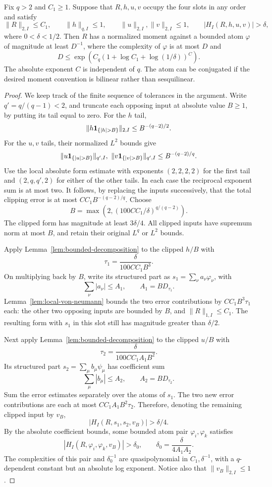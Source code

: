 \begin{lemma}\label{lem:detection}
Fix \(q>2\) and \(C_1\ge1\).
Suppose that \(R,h,u,v\) occupy the four slots in any order and satisfy
\[
 \|R\|_{2,I}\le C_1,\qquad
 \|h\|_{q,I}\le1,\qquad
 \|u\|_{2,I},\|v\|_{2,I}\le1,\qquad
 |H_I(R,h,u,v)|>\delta ,
\]
where \(0<\delta<1/2\).
Then \(R\) has a normalized moment against a bounded atom
\(\varphi\) of magnitude at least \(D^{-1}\), where the complexity of
\(\varphi\) is at most \(D\) and
\[
 D\le
 \exp\!\left(C_q(1+\log C_1+\log(1/\delta))^C\right).
\]
The absolute exponent \(C\) is independent of \(q\).
The atom can be conjugated if the desired moment convention is
bilinear rather than sesquilinear.
\end{lemma}

\begin{proof}
We keep track of the finite sequence of tolerances in the argument.
Write \(q'=q/(q-1)<2\), and truncate each opposing input at absolute
value \(B\ge1\), by putting its tail equal to zero.
For the \(h\) tail,
\[
 \|h\1_{\{|h|>B\}}\|_{2,I}\le B^{-(q-2)/2}.
\]
For the \(u,v\) tails, their normalized \(L^2\) bounds give
\[
 \|u\1_{\{|u|>B\}}\|_{q',I},
 \ \|v\1_{\{|v|>B\}}\|_{q',I}
       \le B^{-(q-2)/q}.
\]
Use the local absolute form estimate with exponents
\((2,2,2,2)\) for the first tail and
\((2,q,q',2)\) for either of the other tails.
In each case the reciprocal exponent sum is at most two.
It follows, by replacing the inputs successively, that the total
clipping error is at most \(C C_1B^{-(q-2)/q}\).
Choose
\[
 B=\max\!\left(2,(100C C_1/\delta)^{q/(q-2)}\right).
\]
The clipped form has magnitude at least \(3\delta/4\).
All clipped inputs have supremum norm at most \(B\), and retain
their original \(L^q\) or \(L^2\) bounds.

Apply Lemma~\ref{lem:bounded-decomposition} to the clipped \(h/B\)
with
\[
 \tau_1=\frac{\delta}{100C C_1B^3}.
\]
On multiplying back by \(B\), write its structured part as
\(s_1=\sum_\nu a_\nu\varphi_\nu\), with
\[
 \sum_\nu|a_\nu|\le A_1,\qquad A_1=B D_{\tau_1}.
\]
Lemma~\ref{lem:local-von-neumann} bounds the two error contributions
by \(C C_1B^3\tau_1\) each: the other two opposing inputs are bounded
by \(B\), and \(\|R\|_{1,I}\le C_1\).
The resulting form with \(s_1\) in this slot still has magnitude
greater than \(\delta/2\).

Next apply Lemma~\ref{lem:bounded-decomposition} to the clipped \(u/B\)
with
\[
 \tau_2=\frac{\delta}{100C C_1A_1B^2}.
\]
Its structured part \(s_2=\sum_\mu b_\mu\psi_\mu\) has coefficient sum
\[
 \sum_\mu|b_\mu|\le A_2,\qquad A_2=B D_{\tau_2}.
\]
Sum the error estimates separately over the atoms of \(s_1\).
The two new error contributions are each at most
\(C C_1A_1B^2\tau_2\).
Therefore, denoting the remaining clipped input by \(v_B\),
\[
 |H_I(R,s_1,s_2,v_B)|>\delta/4.
\]
By the absolute coefficient bounds, some bounded atom pair
\(\varphi_i,\varphi_k\) satisfies
\[
 |H_I(R,\varphi_i,\varphi_k,v_B)|
       >\delta_0,\qquad
 \delta_0=\frac{\delta}{4A_1A_2}.
\]
The complexities of this pair and \(\delta_0^{-1}\) are
quasipolynomial in \(C_1,\delta^{-1}\), with a \(q\)-dependent
constant but an absolute log exponent.  Notice also that
\(\|v_B\|_{2,I}\le1\).


\end{proof}
